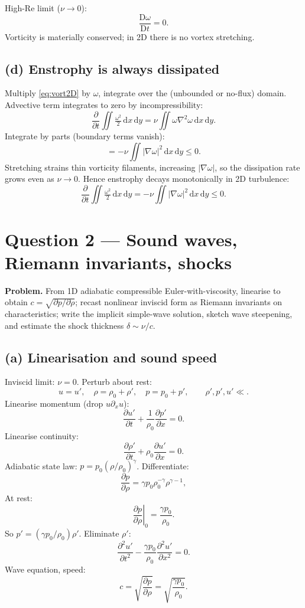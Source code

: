 \documentclass[11pt]{article}
\newcommand{\D}{\mathrm{D}}
\newcommand{\de}{\mathrm{d}}
\newcommand{\pd}[2]{\frac{\partial #1}{\partial #2}}
\newcommand{\pdd}[2]{\frac{\partial^{2} #1}{\partial #2^{2}}}
\newcommand{\Lap}{\nabla^{2}}
\begin{document}
High-Re limit ($\nu\to 0$):
\begin{equation}
\boxed{\;\frac{\D\omega}{\D t} = 0.\;}
\label{eq:vortInv}
\end{equation}
Vorticity is materially conserved; in 2D there is no vortex stretching.

\subsection*{(d) Enstrophy is always dissipated}

Multiply \eqref{eq:vort2D} by $\omega$, integrate over the (unbounded or no-flux) domain. Advective term integrates to zero by incompressibility:
\[ \pd{}{t}\iint \tfrac{\omega^2}{2}\,\de x\,\de y = \nu\iint \omega\Lap\omega\,\de x\,\de y. \]
Integrate by parts (boundary terms vanish):
\[ = -\nu\iint |\nabla\omega|^2\,\de x\,\de y \le 0. \]
Stretching strains thin vorticity filaments, increasing $|\nabla\omega|$, so the dissipation rate grows even as $\nu\to 0$. Hence enstrophy decays monotonically in 2D turbulence:
\[ \boxed{\;\pd{}{t}\iint \tfrac{\omega^2}{2}\,\de x\,\de y = -\nu\iint|\nabla\omega|^2\,\de x\,\de y \le 0.\;} \]

\section*{Question 2 --- Sound waves, Riemann invariants, shocks}

\textbf{Problem.} From 1D adiabatic compressible Euler-with-viscosity, linearise to obtain $c=\sqrt{\partial p/\partial \rho}$; recast nonlinear inviscid form as Riemann invariants on characteristics; write the implicit simple-wave solution, sketch wave steepening, and estimate the shock thickness $\delta\sim\nu/c$.

\subsection*{(a) Linearisation and sound speed}

Inviscid limit: $\nu=0$. Perturb about rest:
\[ u = u', \quad \rho = \rho_0 + \rho', \quad p = p_0 + p',\qquad \rho',p',u'\ll. \]
Linearise momentum (drop $u\partial_x u$):
\[ \pd{u'}{t} + \frac{1}{\rho_0}\pd{p'}{x} = 0. \]
Linearise continuity:
\[ \pd{\rho'}{t} + \rho_0\pd{u'}{x} = 0. \]
Adiabatic state law: $p = p_0(\rho/\rho_0)^\gamma$. Differentiate:
\[ \pd{p}{\rho} = \gamma p_0\rho_0^{-\gamma}\rho^{\gamma-1}, \]
At rest:
\[ \left.\pd{p}{\rho}\right|_0 = \frac{\gamma p_0}{\rho_0}. \]
So $p' = (\gamma p_0/\rho_0)\rho'$. Eliminate $\rho'$:
\[ \pdd{u'}{t} - \frac{\gamma p_0}{\rho_0}\pdd{u'}{x} = 0. \]
Wave equation, speed:
\begin{equation}
\boxed{\;c = \sqrt{\pd{p}{\rho}} = \sqrt{\frac{\gamma p_0}{\rho_0}}.\;}
\label{eq:c}
\end{equation}
\end{document}
